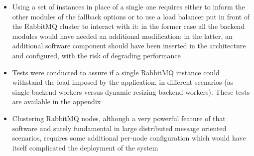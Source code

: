   \begin{itemize}
    \item Using a set of instances in place of a single one requires either to inform the other modules of the fallback options or to use a load balancer put in front of the RabbitMQ cluster to interact with it: in the former case all the backend modules would have needed an additional modification; in the latter, an additional software component should have been inserted in the architecture and configured, with the risk of degrading performance
    \item Tests were conducted to assure if a single RabbitMQ instance could withstand the load imposed by the application, in different scenarios (as single backend workers versus dynamic resizing backend workers). These tests are available in the appendix
    \item Clustering RabbitMQ nodes, although a very powerful feature of that software and surely fundamental in large distributed message oriented scenarios, requires some additional per-node configuration which would have itself complicated the deployment of the system
  \end{itemize}
